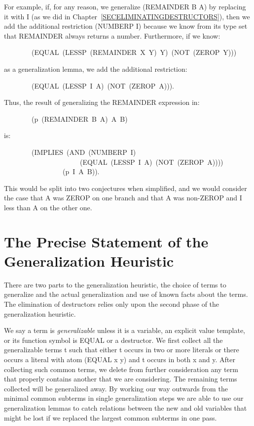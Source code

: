 \documentclass[10pt]{book}
\newenvironment{pubasis}{\begin{flushleft}}{\end{flushleft}}
\begin{document}
For example,
if, for any reason, we generalize (REMAINDER B A)  by replacing it with I
(as we did in Chapter~\ref{SECELIMINATINGDESTRUCTORS}), then we
add the additional restriction (NUMBERP I) because we know from its type set
that
REMAINDER always returns a number.  Furthermore, if we
know:
\begin{pubasis}
~~~~~~~~(EQUAL~(LESSP~(REMAINDER~X~Y)~Y)~(NOT~(ZEROP~Y)))\\
\end{pubasis}
as a generalization lemma, we add the additional restriction:
\begin{pubasis}
~~~~~~~~(EQUAL~(LESSP~I~A)~(NOT~(ZEROP~A))).\\
\end{pubasis}
Thus, the result of generalizing the REMAINDER expression in:
\begin{pubasis}
~~~~~~~~(p~(REMAINDER~B~A)~A~B)\\
\end{pubasis}
is:
\begin{pubasis}
~~~~~~~~(IMPLIES~(AND~(NUMBERP~I)\\
~~~~~~~~~~~~~~~~~~~~~~(EQUAL~(LESSP~I~A)~(NOT~(ZEROP~A))))\\
~~~~~~~~~~~~~~~~~(p~I~A~B)).\\
\end{pubasis}
This would be split into two conjectures when simplified,
and we would consider the case that A was ZEROP on one branch
and that A was non-ZEROP and I less than A on the other one.

\section{The Precise Statement of the Generalization Heuristic}
There are
two parts to the generalization heuristic, the choice of terms to generalize and  the actual
generalization and use of known facts about the terms.  The elimination of
destructors  relies only upon the second phase of the generalization heuristic.

We say a term is \emph{generalizable} unless it is a variable,
an explicit value template, or its function symbol
is EQUAL or a destructor.
We first collect all the generalizable terms t such that either
t occurs in two or more literals or there occurs
a literal with atom (EQUAL x y) and t occurs in both x and y.
After collecting such common terms, we delete from further
consideration any term that properly contains another that
we are considering.  The remaining terms collected
will be generalized away.
By working our way outwards from the minimal 
common subterms in single generalization steps we are
able to use our generalization lemmas to catch relations between the new
and old variables that might be lost if we replaced the largest
common subterms in one pass.
\end{document}
